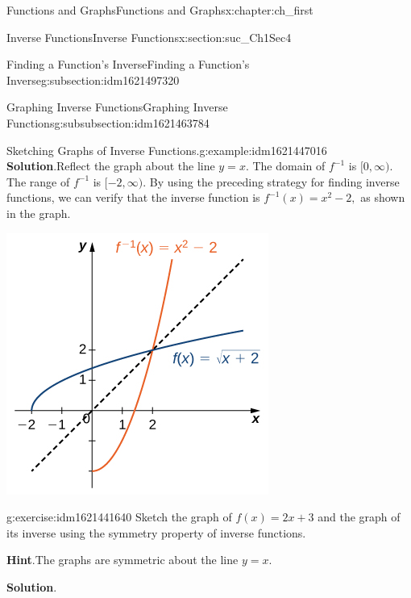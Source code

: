 \documentclass[oneside,10pt,]{book}
\newcommand{\blocktitlefont}{\relax}
\numberwithin{equation}{section}
\begin{document}
\begin{chapterptx}{Functions and Graphs}{}{Functions and Graphs}{}{}{x:chapter:ch_first}
\begin{sectionptx}{Inverse Functions}{}{Inverse Functions}{}{}{x:section:suc_Ch1Sec4}
\begin{subsectionptx}{Finding a Function’s Inverse}{}{Finding a Function’s Inverse}{}{}{g:subsection:idm1621497320}
\begin{subsubsectionptx}{Graphing Inverse Functions}{}{Graphing Inverse Functions}{}{}{g:subsubsection:idm1621463784}
\begin{example}{Sketching Graphs of Inverse Functions.}{g:example:idm1621447016}
\noindent\textbf{\blocktitlefont Solution}.\hypertarget{g:solution:idm1621448296}{}\quad{}Reflect the graph about the line \(y=x.\) The domain of \(f^{-1} \) is \([0,\infty ).\) The range of \(f^{-1} \) is \([-2,\infty ).\) By using the preceding strategy for finding inverse functions, we can verify that the inverse function is \(f^{-1} (x)=x^2-2,\) as shown in the graph.%
\begin{image}{0.25}{0.5}{0.25}%
\includegraphics[width=\linewidth]{external/CNX_Calc_Figure_01_04_010.jpg}
\end{image}%
\end{example}
\begin{inlineexercise}{}{g:exercise:idm1621441640}%
Sketch the graph of \(f(x)=2x+3\) and the graph of its inverse using the symmetry property of inverse functions.%
\par\smallskip%
\noindent\textbf{\blocktitlefont Hint}.\hypertarget{g:hint:idm1621438568}{}\quad{}The graphs are symmetric about the line \(y=x.\)%
\par\smallskip%
\noindent\textbf{\blocktitlefont Solution}.\hypertarget{g:solution:idm1621440616}{}\quad{} \begin{image}{0.25}{0.5}{0.25}%

\end{image}
\end{inlineexercise}
\end{subsubsectionptx}
\end{subsectionptx}
\end{sectionptx}
\end{chapterptx}
\end{document}
